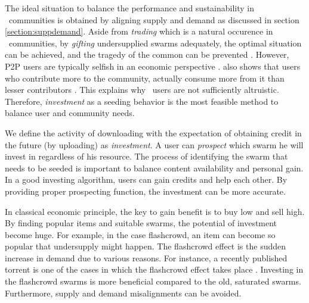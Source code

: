 The ideal situation to balance the performance and sustainability in \bt~communities is obtained by aligning supply and demand as discussed in section \ref{section:suppdemand}. Aside from \textit{trading} which is a natural occurence in \bt~communities, by \textit{gifting} undersupplied swarms adequately, the optimal situation can be achieved, and the tragedy of the common can be prevented \cite{2002:reputationtotragedy:milinski}. However, P2P users are typically selfish in an economic perspective \cite{2014:userbehaviourprivate:jia}. \citeauthor{2009:demandsupplyres:andrade} also shows that users who contribute more to the community, actually consume more from it than lesser contributors \cite{2009:demandsupplyres:andrade}. This explains why \bt~users are not sufficiently altruistic. Therefore, \textit{investment} as a seeding behavior is the most feasible method to balance user and community needs.

We define the activity of downloading with the expectation of obtaining credit in the future (by uploading) as \textit{investment}. A user can \textit{prospect} which swarm he will invest in regardless of his resource. The process of identifying the swarm that needs to be seeded is important to balance content availability and personal gain. In a good investing algorithm, users can gain credits and help each other. By providing proper prospecting function, the investment can be more accurate.


In classical economic principle, the key to gain benefit is to buy low and sell high. By finding popular items and suitable swarms, the potential of investment become huge. For example, in the case flashcrowd, an item can become so popular that undersupply might happen. The flashcrowd effect is the sudden increase in demand due to various reasons. For instance, a recently published torrent is one of the cases in which the flashcrowd effect takes place \cite{2013:swarmevolution:su}. Investing in the flashcrowd swarms is more beneficial compared to the old, saturated swarms. Furthermore, supply and demand misalignments can be avoided.

